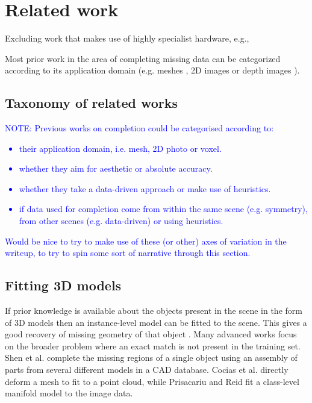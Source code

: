 \documentclass[10pt,twocolumn,letterpaper]{article}
\makeatletter
\renewcommand*{\eg}{e.g.\@\xspace}
\renewcommand*{\ie}{i.e.\@\xspace}
\newcommand*{\ea}{et al.\@\xspace}
\newcommand{\note}[1]{\textcolor{blue}{NOTE: #1}}
\makeatother
\begin{document}
\section{Related work}

Excluding work that makes use of highly specialist hardware, \eg \cite{velten-nature-2012},

Most prior work in the area of completing missing data can be categorized according to its application domain (\eg meshes \cite{schnabel-eurographics-2009, ju-cst-2009}, 2D images \cite{gupta-cvpr-2011} or depth images \cite{shen-tog-2012}).



\subsection{Taxonomy of related works}
\note{
Previous works on completion could be categorised according to:
\begin{itemize}
\item their application domain, \ie mesh, 2D photo or voxel. 
\item whether they aim for aesthetic or absolute accuracy.
\item whether they take a data-driven approach or make use of heuristics.
\item if data used for completion come from within the same scene (\eg symmetry), from other scenes (\eg data-driven) or using heuristics.
\end{itemize}
Would be nice to try to make use of these (or other) axes of variation in the writeup, to try to spin some sort of narrative through this section.
}

\subsection{Fitting 3D models}
If prior knowledge is available about the objects present in the scene in the form of 3D models then an instance-level model can be fitted to the scene.
This gives a good recovery of missing geometry of that object \cite{hinterstoisser-accv-2012, drost-3dimpvt-2012, rusu-iros-2010}.
Many advanced works focus on the broader problem where an exact match is not present in the training set.
Shen \ea \cite{shen-tog-2012} complete the missing regions of a single object using an assembly of parts from several different models in a CAD database.
Cocias \ea \cite{cocias-cgvcv-2013} directly deform a mesh to fit to a point cloud, while Prisacariu and Reid \cite{prisacariu-iccv-2011} fit a class-level manifold model to the image data.
\end{document}
